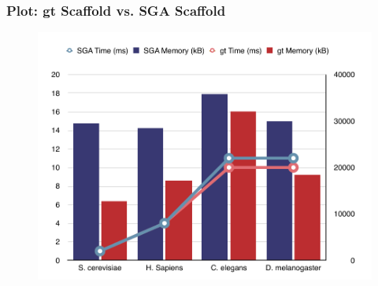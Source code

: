 \documentclass[xcolor=pst]{beamer}
\begin{document}
\begin{frame}
  \frametitle{Plot: gt Scaffold vs. SGA Scaffold}
  \begin{figure}[t]
    \includegraphics[width=\textwidth,height=0.8\textheight,keepaspectratio]{figures/sga_vs_gt.pdf}
  \end{figure}
\end{frame}
\end{document}
